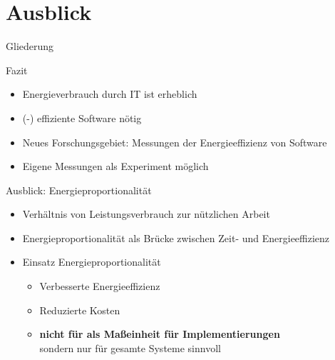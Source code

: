 \section{Ausblick}
\label{s.ausblick}

\begin{frame}{Gliederung}
\tableofcontents[currentsection]
\end{frame}

\begin{frame}{Fazit}
\begin{itemize}
	\item  Energieverbrauch durch IT ist erheblich
	\item (\COz-) effiziente Software nötig 
	\item Neues Forschungsgebiet: Messungen der Energieeffizienz von Software
	\item Eigene Messungen als Experiment möglich
\end{itemize}
\end{frame}


\begin{frame}{Ausblick: Energieproportionalität \cite{wong_retrospective_2015}}
				\begin{itemize}
					\item Verhältnis von Leistungsverbrauch zur nützlichen Arbeit
					\item  Energieproportionalität als Brücke zwischen Zeit- und Energieeffizienz
				\item Einsatz Energieproportionalität
				 \begin{itemize}
					 \item Verbesserte Energieeffizienz 
					 \item Reduzierte Kosten 
					 \item \textbf<2->{nicht für als Maßeinheit für Implementierungen }\\sondern nur für gesamte Systeme sinnvoll
					\end{itemize}
			\end{itemize}
\end{frame}
